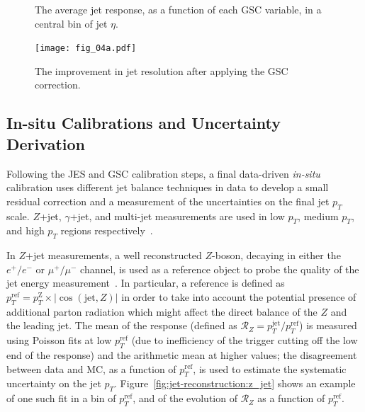 \begin{figure}
\centering
{}

\caption{The average jet response, as a function of each GSC variable, in a central bin of jet $\eta$.}
\label{fig:jet-reconstruction:gsc}
\end{figure}

\begin{figure}
\centering
\texttt{[image: fig\_04a.pdf]}
\caption{The improvement in jet resolution after applying the GSC correction.}
\label{fig:jet-reconstruction:resolution_gsc}
\end{figure}


\subsection{In-situ Calibrations and Uncertainty Derivation}
\label{chapter:jet-reconstruction:insitu}

Following the JES and GSC calibration steps, a final data-driven \textit{in-situ} calibration uses different jet balance techniques in data to develop a small residual correction and a measurement of the uncertainties on the final jet $p_T$ scale. $Z$+jet, $\gamma$+jet, and multi-jet measurements are used in low $p_T$, medium $p_T$, and high $p_T$ regions respectively~\cite{ATLAS-CONF-2015-017}.

In $Z$+jet measurements, a well reconstructed $Z$-boson, decaying in either the $e^+/e^-$ or $\mu^+/\mu^-$ channel, is used as a reference object to probe the quality of the jet energy measurement~\cite{JES2011}. In particular, a reference \pt is defined as $p_T^\mathrm{ref} = p_T^\mathrm{Z} \times |\cos(\mathrm{jet}, Z) |$ in order to take into account the potential presence of additional parton radiation which might affect the direct balance of the $Z$ and the leading jet. The mean of the response (defined as $\mathcal{R}_Z = p_T^\mathrm{jet} / p_T^\mathrm{ref}$) is measured using Poisson fits at low $p_T^\mathrm{ref}$ (due to inefficiency of the trigger cutting off the low end of the response) and the arithmetic mean at higher values; the disagreement between data and MC, as a function of $p_T^\mathrm{ref}$, is used to estimate the systematic uncertainty on the jet $p_T$. Figure~\ref{fig:jet-reconstruction:z_jet} shows an example of one such fit in a bin of $p_T^\mathrm{ref}$, and of the evolution of $\mathcal{R}_Z$ as a function of $p_T^\mathrm{ref}$.

